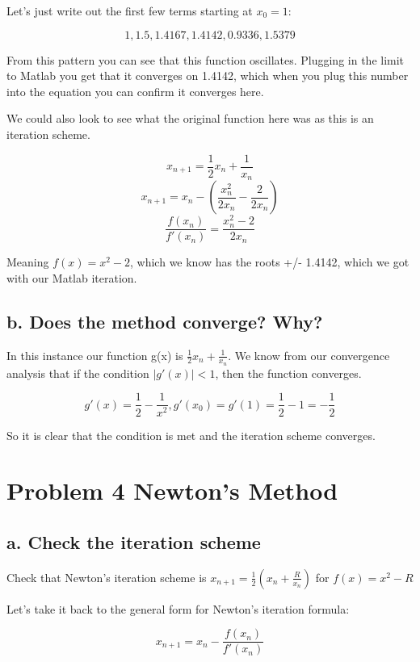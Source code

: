 \documentclass[]{article}
\begin{document}
Let's just write out the first few terms starting at \(x_0 = 1\):

\[1, 1.5, 1.4167, 1.4142, 0.9336, 1.5379\]

From this pattern you can see that this function oscillates. Plugging in
the limit to Matlab you get that it converges on 1.4142, which when you
plug this number into the equation you can confirm it converges here.

We could also look to see what the original function here was as this is
an iteration scheme.

\[x_{n+1} = \frac12x_n + \frac1{x_n}\]
\[x_{n+1} = x_n - (\frac{x_n^2}{2x_n}-\frac{2}{2x_n})\]
\[\frac{f(x_n)}{f'(x_n)} = \frac{x_n^2-2}{2x_n}\]

Meaning \(f(x) = x^2-2\), which we know has the roots +/- 1.4142, which
we got with our Matlab iteration.

\hypertarget{b.-does-the-method-converge-why}{%
\subsection{b. Does the method converge?
Why?}\label{b.-does-the-method-converge-why}}

In this instance our function g(x) is \(\frac12x_n + \frac1{x_n}\). We
know from our convergence analysis that if the condition
\(|g'(x)| < 1\), then the function converges.

\[g'(x) = \frac12 - \frac1{x^2}, g'(x_0) = g'(1) = \frac12-1 = -\frac12\]

So it is clear that the condition is met and the iteration scheme
converges.

\hypertarget{problem-4-newtons-method}{%
\section{Problem 4 Newton's Method}\label{problem-4-newtons-method}}

\hypertarget{a.-check-the-iteration-scheme}{%
\subsection{a. Check the iteration
scheme}\label{a.-check-the-iteration-scheme}}

Check that Newton's iteration scheme is
\(x_{n+1} = \frac12(x_n + \frac{R}{x_n})\) for \(f(x) = x^2 - R\)

Let's take it back to the general form for Newton's iteration formula:

\[x_{n+1} = x_n-\frac{f(x_n)}{f'(x_n)}\]
\end{document}
